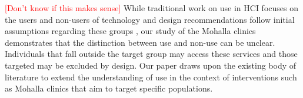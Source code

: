 \textcolor{red}{[Don't know if this makes sense]} While traditional work on use in HCI focuses on the users and non-users of technology and design recommendations follow initial assumptions regarding these groups \cite{?}, our study of the Mohalla clinics demonstrates that the distinction between use and non-use can be unclear. Individuals that fall outside the target group may access these services \cite{baumer2015usees} and those targeted may be excluded by design. Our paper draws upon the existing body of literature to extend the understanding of use in the context of interventions such as Mohalla clinics that aim to target specific populations.